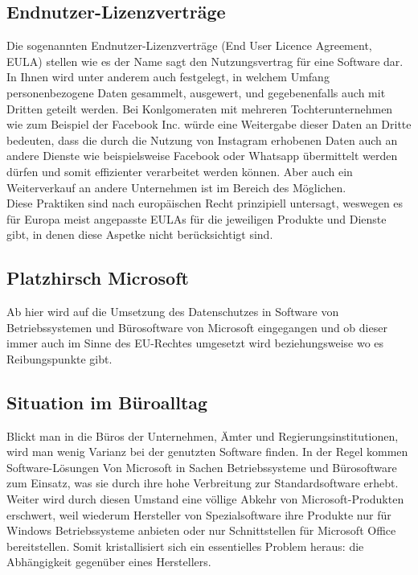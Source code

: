 \subsection{Endnutzer-Lizenzverträge}
Die sogenannten Endnutzer-Lizenzverträge (\glqq End User Licence Agreement\grqq{}, EULA) stellen wie es der Name sagt den Nutzungsvertrag für eine Software dar. In Ihnen wird unter anderem auch festgelegt, in welchem Umfang personenbezogene Daten gesammelt, ausgewert, und gegebenenfalls auch mit Dritten geteilt werden. Bei Konlgomeraten mit mehreren Tochterunternehmen wie zum Beispiel der Facebook Inc. würde eine Weitergabe dieser Daten an Dritte bedeuten, dass die durch die Nutzung von Instagram erhobenen Daten auch an andere Dienste wie beispielsweise Facebook oder Whatsapp übermittelt werden dürfen und somit effizienter verarbeitet werden können. Aber auch ein Weiterverkauf an andere Unternehmen ist im Bereich des Möglichen.\\
Diese Praktiken sind nach europäischen Recht prinzipiell untersagt, weswegen es für Europa meist angepasste EULAs für die jeweiligen Produkte und Dienste gibt, in denen diese Aspetke nicht berücksichtigt sind.\\

\subsection{Platzhirsch Microsoft}
Ab hier wird auf die Umsetzung des Datenschutzes in Software von Betriebssystemen und Bürosoftware von Microsoft eingegangen und ob dieser immer auch im Sinne des EU-Rechtes umgesetzt wird beziehungsweise wo es Reibungspunkte gibt.

\subsection{Situation im Büroalltag}
Blickt man in die Büros der Unternehmen, Ämter und Regierungsinstitutionen, wird man wenig Varianz bei der genutzten Software finden. In der Regel kommen Software-Lösungen Von Microsoft in Sachen Betriebssysteme und Bürosoftware zum Einsatz, was sie durch ihre hohe Verbreitung zur Standardsoftware erhebt. Weiter wird durch diesen Umstand eine völlige Abkehr von Microsoft-Produkten erschwert, weil wiederum Hersteller von Spezialsoftware ihre Produkte nur für Windows Betriebssysteme anbieten oder nur Schnittstellen für Microsoft Office bereitstellen. Somit kristallisiert sich ein essentielles Problem heraus: die Abhängigkeit gegenüber eines Herstellers.



